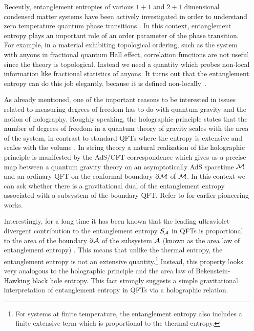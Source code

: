 \documentclass[12pt]{article}
\def\p{\partial}
\def\CA{{\cal A}}
\def\p{\partial}
\def\p{\partial}
\def\bulk{{\cal M}}
\def\bdy{\p{\cal M}}
\def\rA{\CA}
\def\de{\partial}
\begin{document}
Recently, entanglement entropies of various $1+1$ and $2+1$ dimensional condensed matter systems have been actively investigated in order to understand zero temperature quantum phase transitions   \cite{Vidal:2002rm, Calabrese:2005zw, Kitaev:2005dm, LevinWen, Fendley:2006gr}. In this context, entanglement entropy plays an important role of an order  parameter of the phase transition. For example, in a  material exhibiting topological ordering, such as the system with anyons in  fractional quantum Hall effect, correlation functions are not useful since the theory is topological. Instead we need a quantity which probes non-local information like fractional statistics of anyons. It turns out that the entanglement entropy can do this job elegantly, because it is defined non-locally~\cite{Kitaev:2005dm, LevinWen, Fendley:2006gr}.



As already mentioned, one of the important reasons to be interested in issues related to measuring degrees of freedom has to do with quantum gravity and the notion of holography.
 Roughly speaking, the holographic principle states that the number of degrees of freedom
 in a quantum theory of gravity scales with the area of the system, in contrast to standard
 QFTs where the entropy is extensive and scales with the
 volume \cite{Hooft:1993gx, Susskind:1994vu, Bigatti:1999dp}. In string theory a natural
 realization of the holographic principle is manifested by the AdS/CFT correspondence
 \cite{Maldacena:1997re, Aharony:1999ti} which gives us a precise map between a quantum
 gravity theory on an asymptotically AdS spacetime $\bulk$
 and an ordinary QFT  on the conformal boundary $\bdy$
 of $\bulk$. In this context we can ask whether there is a gravitational  dual of
 the entanglement entropy associated with a subsystem of the boundary QFT. Refer to
 \cite{Hawking:2000da, Maldacena:2001kr} for earlier pioneering works.

Interestingly, for a long time it has been known that  the leading
ultraviolet divergent contribution to the entanglement entropy
$S_{\rA}$ in QFTs is proportional to the area of the boundary
$\de\rA$ of the subsystem $\rA$ (known as the area law of
entanglement entropy) \cite{Bombelli:1986rw, Srednicki:1993im}. This
means that unlike the thermal entropy, the entanglement entropy is not
an extensive quantity.\footnote{For systems at finite temperature,
the entanglement entropy also includes a finite extensive term
which is proportional to the thermal entropy.} Instead, this
property looks very analogous to the holographic principle and
 the area law of Bekenstein-Hawking
black hole entropy. This fact strongly suggests a simple
gravitational interpretation of entanglement entropy in QFTs via a
holographic relation.
\end{document}

